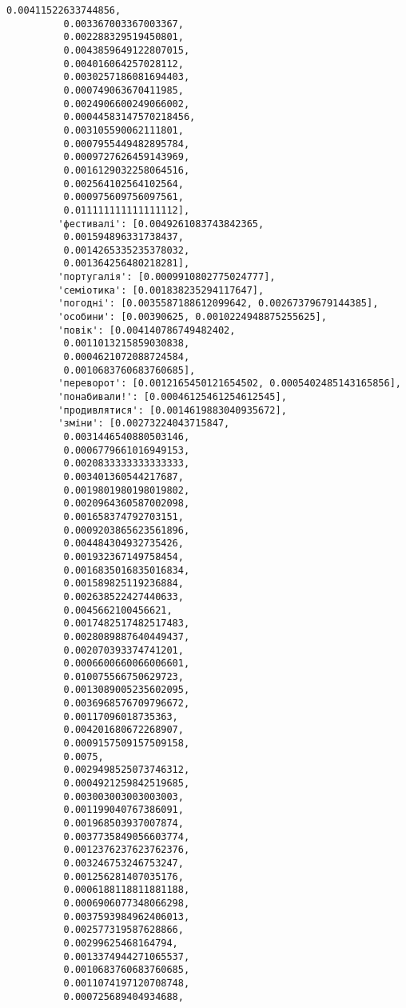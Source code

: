 \documentclass[11pt]{article}
\begin{document}
\begin{Verbatim}[commandchars=\\\{\}]
          0.00411522633744856,
          0.003367003367003367,
          0.002288329519450801,
          0.0043859649122807015,
          0.004016064257028112,
          0.0030257186081694403,
          0.000749063670411985,
          0.0024906600249066002,
          0.00044583147570218456,
          0.003105590062111801,
          0.0007955449482895784,
          0.0009727626459143969,
          0.0016129032258064516,
          0.002564102564102564,
          0.000975609756097561,
          0.011111111111111112],
         'фестивалі': [0.0049261083743842365,
          0.001594896331738437,
          0.0014265335235378032,
          0.001364256480218281],
         'португалія': [0.0009910802775024777],
         'семіотика': [0.001838235294117647],
         'погодні': [0.0035587188612099642, 0.00267379679144385],
         'особини': [0.00390625, 0.0010224948875255625],
         'повік': [0.004140786749482402,
          0.0011013215859030838,
          0.0004621072088724584,
          0.0010683760683760685],
         'переворот': [0.0012165450121654502, 0.0005402485143165856],
         'понабивали!': [0.00046125461254612545],
         'продивлятися': [0.0014619883040935672],
         'зміни': [0.00273224043715847,
          0.0031446540880503146,
          0.0006779661016949153,
          0.0020833333333333333,
          0.003401360544217687,
          0.0019801980198019802,
          0.0020964360587002098,
          0.001658374792703151,
          0.0009203865623561896,
          0.004484304932735426,
          0.001932367149758454,
          0.0016835016835016834,
          0.001589825119236884,
          0.002638522427440633,
          0.0045662100456621,
          0.0017482517482517483,
          0.0028089887640449437,
          0.002070393374741201,
          0.0006600660066006601,
          0.010075566750629723,
          0.0013089005235602095,
          0.0036968576709796672,
          0.00117096018735363,
          0.004201680672268907,
          0.0009157509157509158,
          0.0075,
          0.0029498525073746312,
          0.0004921259842519685,
          0.003003003003003003,
          0.001199040767386091,
          0.001968503937007874,
          0.0037735849056603774,
          0.0012376237623762376,
          0.003246753246753247,
          0.001256281407035176,
          0.0006188118811881188,
          0.0006906077348066298,
          0.0037593984962406013,
          0.002577319587628866,
          0.00299625468164794,
          0.0013374944271065537,
          0.0010683760683760685,
          0.0011074197120708748,
          0.000725689404934688,

\end{Verbatim}
\end{document}
